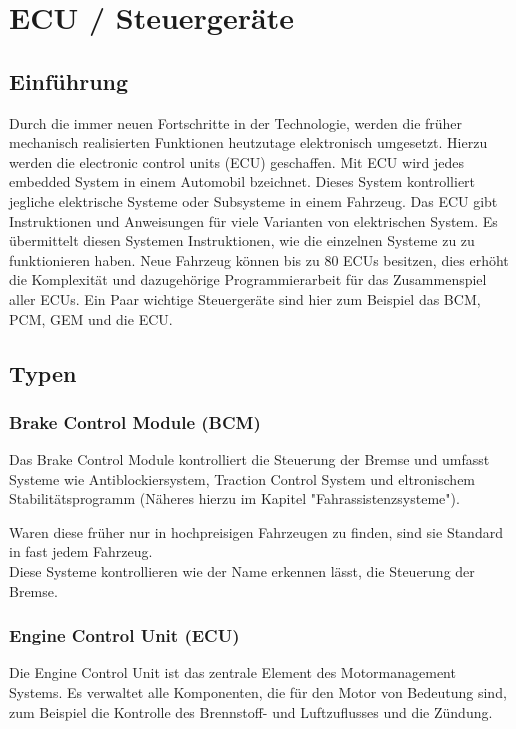 \section{ECU / Steuergeräte}
    \subsection{Einführung}
    Durch die immer neuen Fortschritte in der Technologie, werden die früher mechanisch realisierten
    Funktionen heutzutage elektronisch umgesetzt. Hierzu werden die electronic control units (ECU)
    geschaffen. Mit ECU wird jedes embedded System in einem
    Automobil bzeichnet. Dieses System kontrolliert jegliche elektrische Systeme
    oder Subsysteme in einem Fahrzeug. Das ECU gibt
    Instruktionen und Anweisungen für viele Varianten von elektrischen System. Es übermittelt
    diesen Systemen Instruktionen, wie die einzelnen Systeme zu 
    zu funktionieren haben. Neue Fahrzeug können bis zu 80 ECUs besitzen, dies erhöht die
    Komplexität und dazugehörige Programmierarbeit für das Zusammenspiel aller ECUs. Ein
    Paar wichtige Steuergeräte sind hier zum Beispiel das BCM, PCM, GEM und die ECU.
    ~\cite{ECU.PB6} ~\cite{ECU.PB5} ~\cite{ECU.PB4} ~\cite{ECU.PB3} ~\cite{ECU.PB2} ~\cite{ECU.PB1}

    \subsection{Typen}
        \subsubsection{Brake Control Module (BCM)}
       Das Brake Control Module kontrolliert die Steuerung der Bremse und umfasst Systeme wie Antiblockiersystem, Traction Control System und eltronischem
       Stabilitätsprogramm (Näheres hierzu im Kapitel "Fahrassistenzsysteme"). 
        
        Waren diese früher nur in hochpreisigen Fahrzeugen zu finden, sind sie Standard in fast jedem Fahrzeug.\\
        Diese Systeme kontrollieren wie der Name erkennen lässt, die Steuerung der Bremse.

        \subsubsection{Engine Control Unit (ECU)}
        Die Engine Control Unit ist das zentrale Element des Motormanagement Systems. Es verwaltet alle
        Komponenten, die für den Motor von Bedeutung sind, zum Beispiel die Kontrolle des Brennstoff- und Luftzuflusses und die Zündung.
        \cite{enginecontrol.PB1} 

